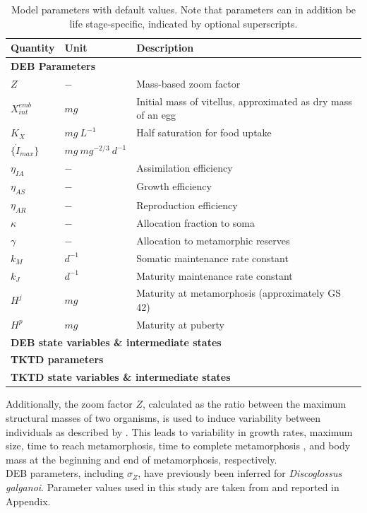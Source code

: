 {\begin{table}[ht]
    \caption{
        Model parameters with default values. 
        Note that parameters can in addition be life stage-specific, indicated by optional superscripts.
    }
    \label{tab:all_params}
    \begin{tabularx}{\textwidth}{lll}
        \hline
        Quantity & Unit & Description  \\ 
        \hline
        \multicolumn{3}{l}{\textbf{DEB Parameters}}\\
        \hline
        $Z$ & $-$ & Mass-based zoom factor \\ 
        $X^{emb}_{int}$ & $mg$ & Initial mass of vitellus, approximated as dry mass of an egg \\
        $K_X$ & $mg\ L^{-1}$  & Half saturation for food uptake \\
        $\{\dot{I}_{max}\}$  & $mg\ mg^{-2/3}\ d^{-1}$ \\
        $\eta_{IA}$ & $-$ & Assimilation efficiency \\
        $\eta_{AS}$ & $-$ & Growth efficiency \\
        $\eta_{AR}$ & $-$ & Reproduction efficiency \\
        $\kappa$ & $-$ & Allocation fraction to soma \\
        $\gamma$ & $-$ & Allocation to metamorphic reserves \\    
        $k_M$ & $d^{-1}$ & Somatic maintenance rate constant \\
        $k_J$ & $d^{-1}$ & Maturity maintenance rate constant \\
        $H^j$ & $mg$ & Maturity at metamorphosis (approximately GS 42) \\
        $H^p$ & $mg$ & Maturity at puberty \\
        \hline
        \multicolumn{3}{l}{\textbf{DEB state variables \& intermediate states}}\\
        \hline
        \multicolumn{3}{l}{\textbf{TKTD parameters}}\\
        \hline
        \multicolumn{3}{l}{\textbf{TKTD state variables \& intermediate states}}\\
    \end{tabularx}
\end{table}}%
%
Additionally, the zoom factor $Z$, calculated as the ratio between the maximum structural masses of two organisms, 
is used to induce variability between individuals as described by \citet{hansulDynamicModellingAmphibian}. 
This leads to variability in growth rates, maximum size, time to reach metamorphosis, 
time to complete metamorphosis , 
and body mass at the beginning and end of metamorphosis, respectively.\\
DEB parameters, including $\sigma_{Z}$, have previously been inferred for \textit{Discoglossus galganoi}. 
Parameter values used in this study are taken from \citet{hansulDynamicModellingAmphibian} and reported in Appendix. 
%
